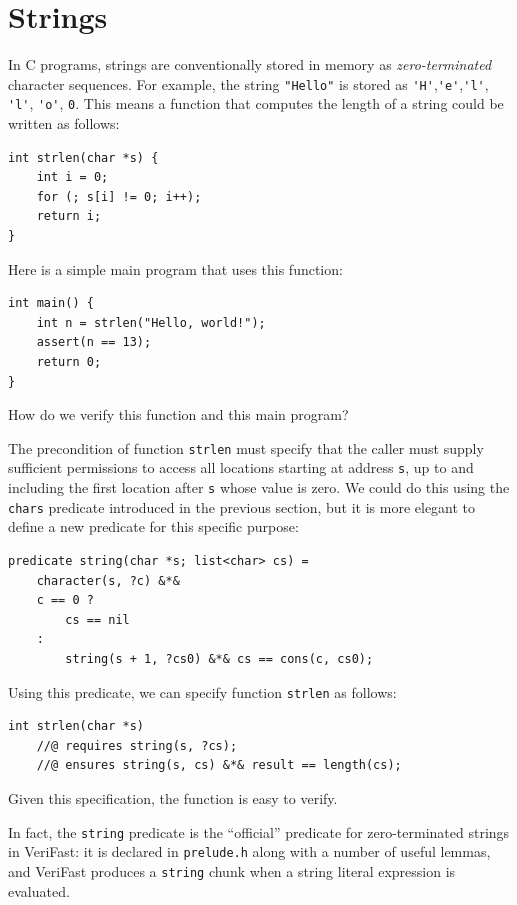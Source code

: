 \documentclass{article}
\begin{document}
\section{Strings}\label{section:strings}

In C programs, strings are conventionally stored in memory as
\emph{zero-terminated} character sequences. For example, the
string \lstinline!"Hello"! is stored as
\lstinline!'H'!,\lstinline!'e'!,\lstinline!'l'!,
\lstinline!'l'!, \lstinline!'o'!, \lstinline!0!. This means a
function that computes the length of a string could be written
as follows:
\begin{lstlisting}
int strlen(char *s) {
    int i = 0;
    for (; s[i] != 0; i++);
    return i;
}
\end{lstlisting}
Here is a simple main program that uses this function:
\begin{lstlisting}
int main() {
    int n = strlen("Hello, world!");
    assert(n == 13);
    return 0;
}
\end{lstlisting}

How do we verify this function and this main program?

The precondition of function \lstinline!strlen! must specify
that the caller must supply sufficient permissions to access
all locations starting at address \lstinline!s!, up to and
including the first location after \lstinline!s! whose value is
zero. We could do this using the \lstinline!chars! predicate
introduced in the previous section, but it is more elegant to
define a new predicate for this specific purpose:
\begin{lstlisting}
predicate string(char *s; list<char> cs) =
    character(s, ?c) &*&
    c == 0 ?
        cs == nil
    :
        string(s + 1, ?cs0) &*& cs == cons(c, cs0);
\end{lstlisting}
Using this predicate, we can specify function \lstinline!strlen! as follows:
\begin{lstlisting}
int strlen(char *s)
    //@ requires string(s, ?cs);
    //@ ensures string(s, cs) &*& result == length(cs);
\end{lstlisting}
Given this specification, the function is easy to verify.

In fact, the \lstinline|string| predicate is the ``official''
predicate for zero-terminated strings in VeriFast: it is
declared in \lstinline|prelude.h| along with a number of useful
lemmas, and VeriFast produces a \lstinline|string| chunk when a
string literal expression is evaluated.
\end{document}
